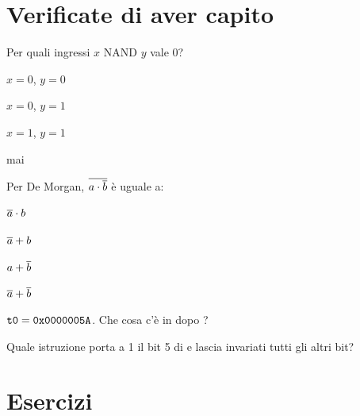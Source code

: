 




\section{Verificate di aver capito}

\begin{quiz}{Per quali ingressi $x$ NAND $y$ vale 0?}
\item $x=0$, $y=0$
\item $x=0$, $y=1$
\item $x=1$, $y=1$
\item mai
\end{quiz}

\begin{quiz}{Per De Morgan, $\overline{a\cdot\overline{b}}$ è uguale a:}
\item $\overline{a}\cdot b$
\item $\overline{a}+b$
\item $a+\overline{b}$
\item $\overline{a}+\overline{b}$
\end{quiz}

\begin{quiz}{$\texttt{t0}=\texttt{0x0000005A}$. Che cosa c'è in  dopo ?}
\item {}
\item {}
\item {}
\item {}
\end{quiz}

\begin{quiz}{Quale istruzione porta a 1 il bit 5 di  e lascia invariati tutti gli altri bit?}
\item {}
\item {}
\item {}
\item {}
\end{quiz}

\section{Esercizi}

